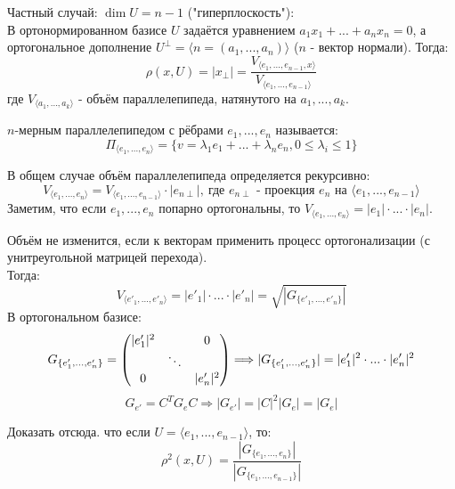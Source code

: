 Частный случай: $\dim U = n-1$ ("гиперплоскость"):\\
В ортонормированном базисе $U$ задаётся уравнением $a_1x_1 +...+a_nx_n = 0$, а ортогональное дополнение $U^{\perp} = \langle n = (a_1,...,a_n)\rangle$ ($n$ - вектор нормали). Тогда:
$$\rho(x, U) = |x_{\perp}| = \frac{V_{\langle e_1,...,e_{n-1},x\rangle}}{V_{\langle e_1,...,e_{n-1}\rangle}}$$
где $V_{\langle a_1,...,a_k\rangle}$ - объём параллелепипеда, натянутого на $a_1,...,a_k$.
\begin{definition}
    $n$-мерным параллелепипедом с рёбрами $e_1,...,e_n$ называется:
    $$\Pi_{\langle e_1,...,e_n\rangle} = \{v = \lambda_1e_1 + ... + \lambda_{n}e_{n}, 0\leqslant\lambda_i\leqslant1\}$$
\end{definition}
\begin{definition}
    В общем случае объём параллелепипеда определяется рекурсивно:
    $$V_{\langle e_1,...,e_n\rangle} = V_{\langle e_1,...,e_{n-1}\rangle} \cdot |e_{n\perp}|,  \ \text{где $e_{n\perp}$ - проекция $e_n$ на $\langle e_1,...,e_{n-1}\rangle$}$$
    Заметим, что если $e_1,...,e_n$ попарно ортогональны, то $V_{\langle e_1,...,e_n\rangle} = |e_1|\cdot...\cdot|e_n|$.
\end{definition}
Объём не изменится, если к векторам применить процесс ортогонализации (с унитреугольной матрицей перехода).\\
Тогда: 
$$V_{\langle e'_1,...,e'_n\rangle} = |e'_1|\cdot...\cdot|e'_n| = \sqrt{|G_{\{ e'_1,...,e'_n\}}|}$$
В ортогональном базисе: 
$$G_{\{ e'_1,...,e'_n\}} = \begin{pmatrix} |e'_1|^2 &\null&0 \\ \null&\ddots&\null \\ 0&\null&|e'_n|^2 \end{pmatrix} \Longrightarrow  |G_{\{ e'_1,...,e'_n\}}| = |e'_1|^2\cdot...\cdot|e'_n|^2$$
$$G_{e'} = C^TG_eC \Longrightarrow |G_{e'}| = |C|^2|G_e| = |G_e|$$
\begin{exercise}
    Доказать отсюда. что если $U = \langle e_1,...,e_{n-1}\rangle$, то:
    $$\rho^2(x, U) = \frac{|G_{\{ e_1,...,e_n\}}|}{|G_{\{ e_1,...,e_{n-1}\}}|}$$
\end{exercise}
